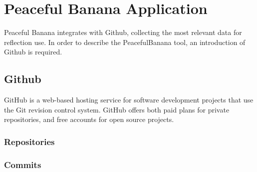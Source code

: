 \chapter{Peaceful Banana Application}
\label{peacefulBananaApplication}
Peaceful Banana integrates with Github, collecting the most relevant data for reflection use. In order to describe the PeacefulBanana tool, an introduction of Github is required.\\

\section{Github}
GitHub is a web-based hosting service for software development projects that use the Git revision control system\footnotemark. GitHub offers both paid plans for private repositories, and free accounts for open source projects. 
\subsection{Repositories}
\subsection{Commits}

